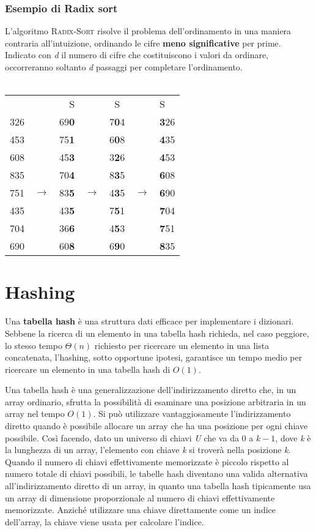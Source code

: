 \documentclass[10pt, a4paper]{report}
\begin{document}
\subsection{Esempio di Radix sort}
L'algoritmo \textsc{Radix-Sort} risolve il problema dell'ordinamento in una maniera contraria all'intuizione, ordinando le cifre \textbf{meno significative} per prime. Indicato con \textit{d} il numero di cifre che costituiscono i valori da ordinare, occorreranno soltanto \textit{d} passaggi per completare l'ordinamento.\\\\
\begin{tabular}{ccrcccl}
& &S & &S & &S \\
326 & &69\textbf{0} & &7\textbf{0}4 & &\textbf{3}26\\
453 & &75\textbf{1}  & &6\textbf{0}8 & &\textbf{4}35\\
608 & &45\textbf{3} & &3\textbf{2}6 & &\textbf{4}53\\
835 & &70\textbf{4} & &8\textbf{3}5 & &\textbf{6}08\\
751 &$\rightarrow$ &83\textbf{5} &$\rightarrow$ &4\textbf{3}5 &$\rightarrow$ &\textbf{6}90\\
435 & &43\textbf{5} & &7\textbf{5}1 & &\textbf{7}04\\
704 & &36\textbf{6} & &4\textbf{5}3 & &\textbf{7}51\\
690 & &60\textbf{8} & &6\textbf{9}0 & &\textbf{8}35
\end{tabular}
\chapter{Hashing}
Una \textbf{tabella hash} è una struttura dati efficace per implementare i dizionari. Sebbene la ricerca di un elemento in una tabella hash richieda, nel caso peggiore, lo stesso tempo $\Theta(n)$ richiesto per ricercare un elemento in una lista concatenata, l'hashing, sotto opportune ipotesi, garantisce un tempo medio per ricercare un elemento in una tabella hash di $O(1)$.

Una tabella hash è una generalizzazione dell'indirizzamento diretto che, in un array ordinario, sfrutta la possibilità di esaminare una posizione arbitraria in un array nel tempo $O(1)$. Si può utilizzare vantaggiosamente l'indirizzamento diretto quando è possibile allocare un array che ha una posizione per ogni chiave possibile. Così facendo, dato un universo di chiavi \textit{U} che va da 0 a $k - 1$, dove \textit{k} è la lunghezza di un array, l'elemento con chiave \textit{k} si troverà nella posizione \textit{k}. Quando il numero di chiavi effettivamente memorizzate è piccolo rispetto al numero totale di chiavi possibili, le tabelle hash diventano una valida alternativa all'indirizzamento diretto di un array, in quanto una tabella hash tipicamente usa un array di dimensione proporzionale al numero di chiavi effettivamente memorizzate. Anziché utilizzare una chiave direttamente come un indice dell'array, la chiave viene usata per calcolare l'indice.
\end{document}
